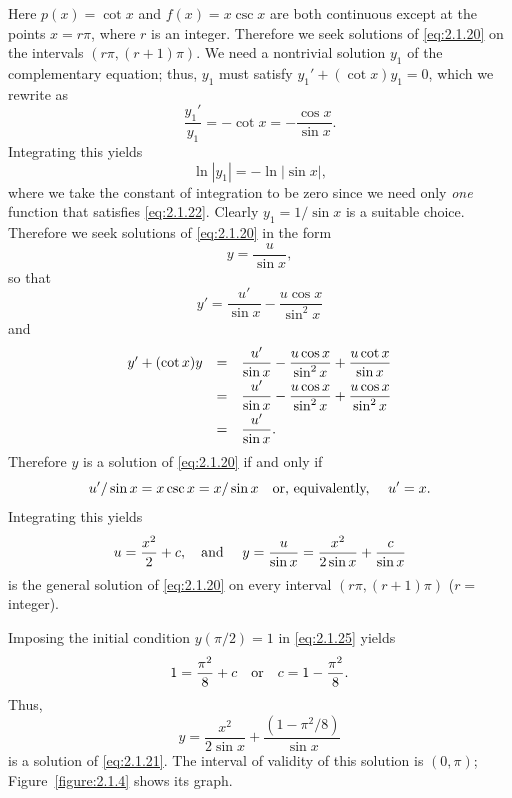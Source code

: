 \begin{examplesolution}
 Here $p(x)=\cot x$ and $f(x)=x\csc x$ are both continuous except at the points
$x=r\pi$, where $r$ is an integer. Therefore we seek solutions of \eqref{eq:2.1.20} on the intervals
$\left(r\pi,(r+1)\pi\right)$. We need a nontrivial solution $y_{1}$ of the complementary equation;
thus, $y_{1}$ must satisfy $y_{1}'+(\cot x)y_{1}=0$, which we rewrite as
\begin{equation}
  \label{eq:2.1.22}\frac{y_{1}'}{y_{1}}=-\cot x=-\frac{\cos x}{\sin x}.
\end{equation}
Integrating this yields
\[
  \ln|y_{1}|=-\ln|\sin x|,
\]
where we take the constant of integration to be zero since we need only {\color{blue}\it one\/}
function that satisfies \eqref{eq:2.1.22}. Clearly $y_{1}=1/\sin x$ is a suitable choice. Therefore
we seek solutions of \eqref{eq:2.1.20} in the form
\[
  y=\frac{u}{\sin x},
\]
so that
\begin{equation}
  \label{eq:2.1.23}y'=\frac{u'}{\sin x}-\frac{u\cos x}{\sin^{2}x}
\end{equation}
and
\begin{equation}
  \label{eq:2.1.24}
  \begin{array}{rcl}
    y'+(\cot x)y & = & \displaystyle\frac{u'}{\sin x}-\displaystyle\frac{u\cos x}{\sin^{2}x}+\displaystyle\frac{u\cot x}{\sin x}    \\[2\jot]
                 & = & \displaystyle\frac{u'}{\sin x}-\displaystyle\frac{u\cos x}{\sin^{2}x}+\displaystyle\frac{u\cos x}{\sin^{2}x} \\[2\jot]
                 & = & \displaystyle\frac{u'}{\sin x}.
  \end{array}
\end{equation}
Therefore $y$ is a solution of \eqref{eq:2.1.20} if and only if
\[
  u'/\sin x=x\csc x=x/\sin x\mbox{\quad or, equivalently, \quad}u'=x.
\]
Integrating this yields
\begin{equation}
  \label{eq:2.1.25}u=\frac{x^{2}}{2}+c,\text{\quad and \quad }y=\frac{u}{\sin x}=\frac{x^{2}}{2\sin x}+\frac{c}{\sin x}
\end{equation}
is the general solution of \eqref{eq:2.1.20} on every interval $\left(r\pi,(r+1)\pi\right)$
($r=$integer).

 Imposing the initial condition $y(\pi/2)=1$ in \eqref{eq:2.1.25} yields
\[
  1=\frac{\pi^{2}}{8}+c\mbox{\quad or\quad}c=1-\frac{\pi^{2}}{8}.
\]
Thus,
\[
  y=\frac{x^{2}}{2\sin x}+\frac{(1-\pi^{2}/8)}{\sin x}
\]
is a solution of \eqref{eq:2.1.21}. The interval of validity of this solution is $(0,\pi)$;
Figure~\ref{figure:2.1.4} shows its graph.


\end{examplesolution}
